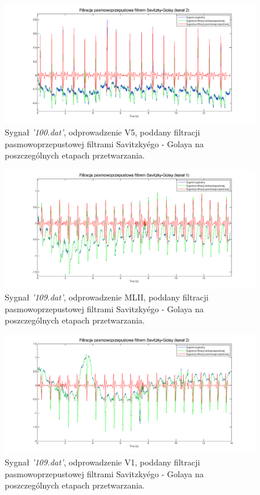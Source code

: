 \documentclass[a4paper]{article}
\begin{document}
\begin{figure}[H]
\centering
\includegraphics[width=1\textwidth]{100_filt2.png}
\caption{\label{filt2} Sygnał \textit{'100.dat'}, odprowadzenie V5, poddany filtracji pasmowoprzepustowej filtrami Savitzky\'ego - Golaya na poszczególnych etapach przetwarzania.}
\end{figure}

\begin{figure}[H]
\centering
\includegraphics[width=1\textwidth]{109_filt1.png}
\caption{\label{filt1_109} Sygnał \textit{'109.dat'}, odprowadzenie MLII, poddany filtracji pasmowoprzepustowej filtrami Savitzky\'ego - Golaya na poszczególnych etapach przetwarzania.}
\end{figure}

\begin{figure}[H]
\centering
\includegraphics[width=1\textwidth]{109_filt2.png}
\caption{\label{filt2_109} Sygnał \textit{'109.dat'}, odprowadzenie V1, poddany filtracji pasmowoprzepustowej filtrami Savitzky\'ego - Golaya na poszczególnych etapach przetwarzania.}
\end{figure}
\end{document}
